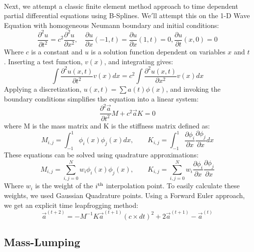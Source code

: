 \documentclass{article}
\begin{document}
\paragraph{}
Next, we attempt a classic finite element method approach to time dependent partial differential equations using B-Splines. We$'$ll attempt this on the 1-D Wave Equation with homogeneous Neumann boundary and initial conditions: 
\begin{equation*}
\frac{\partial ^2 u}{\partial t^2} = c^2\frac{\partial ^2 u}{\partial x^2},\quad \frac{\partial u}{\partial x}(-1,t)=\frac{\partial u}{\partial x}(1,t)=0, \frac{\partial u}{\partial t}(x,0)=0
\end{equation*}
Where $c$ is a constant and $u$ is a solution function dependent on variables $x$ and $t$. Inserting a test function, $v(x)$, and integrating gives: 
\begin{equation*}
\int \frac{\partial ^2 u(x,t)}{\partial t^2}v(x)dx = c^2\int \frac{\partial ^2 u(x,t)}{\partial x^2}v(x)dx
\end{equation*}
Applying a discretization, $u(x,t) = \sum a(t)\phi(x)$, and invoking the boundary conditions simplifies the equation into a linear system:
\begin{equation*}
\frac{\partial ^2\vec{a}}{\partial t^2}M + c^2\vec{a}K=0
\end{equation*}
where M is the mass matrix and K is the stiffness matrix defined as:
\begin{equation*}
M_{i,j}=\int ^1_{-1}\phi _i(x)\phi _j(x)dx,\qquad K_{i,j}=\int ^1_{-1}\frac{\partial \phi _i}{\partial x}\frac{\partial \phi _j}{\partial x}dx
\end{equation*}
These equations can be solved using quadrature approximations:
\begin{equation*}
M_{i,j}=\sum _{i,j=0}^N w_i\phi _i(x)\phi _j(x),\qquad K_{i,j}=\sum _{i,j=0}^N w_i\frac{\partial \phi _i}{\partial x}\frac{\partial \phi _j}{\partial x}
\end{equation*}
Where $w_i$ is the weight of the $i\textsuperscript{th}$ interpolation point. To easily calculate these weights, we used Gaussian Quadrature points. Using a Forward Euler approach, we get an explicit time leapfrogging method:
\begin{equation*}
\vec{a}^{(t+2)} = -M^{-1}K\vec{a}^{(t+1)}(c\times dt)^2+2\vec{a}^{(t+1)} - \vec{a}^{(t)}
\end{equation*}

\subsection*{Mass-Lumping}
\end{document}
